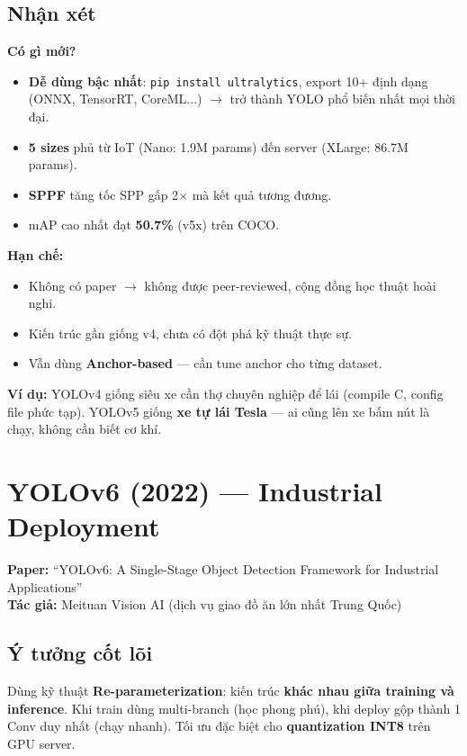 \documentclass[12pt,a4paper]{report}
\begin{document}
\subsection{Nhận xét}

\textbf{Có gì mới?}
\begin{itemize}
    \item \textbf{Dễ dùng bậc nhất}: \texttt{pip install ultralytics}, export 10+ định dạng (ONNX, TensorRT, CoreML...) $\rightarrow$ trở thành YOLO phổ biến nhất mọi thời đại.
    \item \textbf{5 sizes} phủ từ IoT (Nano: 1.9M params) đến server (XLarge: 86.7M params).
    \item \textbf{SPPF} tăng tốc SPP gấp 2$\times$ mà kết quả tương đương.
    \item mAP cao nhất đạt \textbf{50.7\%} (v5x) trên COCO.
\end{itemize}

\textbf{Hạn chế:}
\begin{itemize}
    \item Không có paper $\rightarrow$ không được peer-reviewed, cộng đồng học thuật hoài nghi.
    \item Kiến trúc gần giống v4, chưa có đột phá kỹ thuật thực sự.
    \item Vẫn dùng \textbf{Anchor-based} --- cần tune anchor cho từng dataset.
\end{itemize}

\textbf{Ví dụ:} YOLOv4 giống siêu xe cần thợ chuyên nghiệp để lái (compile C, config file phức tạp). YOLOv5 giống \textbf{xe tự lái Tesla} --- ai cũng lên xe bấm nút là chạy, không cần biết cơ khí.

\section{YOLOv6 (2022) --- Industrial Deployment}
\textbf{Paper:} ``YOLOv6: A Single-Stage Object Detection Framework for Industrial Applications''\\
\textbf{Tác giả:} Meituan Vision AI (dịch vụ giao đồ ăn lớn nhất Trung Quốc)

\subsection{Ý tưởng cốt lõi}
Dùng kỹ thuật \textbf{Re-parameterization}: kiến trúc \textbf{khác nhau giữa training và inference}. Khi train dùng multi-branch (học phong phú), khi deploy gộp thành 1 Conv duy nhất (chạy nhanh). Tối ưu đặc biệt cho \textbf{quantization INT8} trên GPU server.
\end{document}
